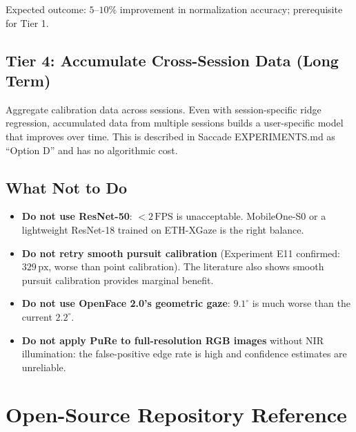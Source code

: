 \documentclass[11pt,a4paper]{article}
\begin{document}
Expected outcome: $5$--$10\%$ improvement in normalization accuracy; prerequisite for Tier 1.

\subsection{Tier 4: Accumulate Cross-Session Data (Long Term)}

Aggregate calibration data across sessions.
Even with session-specific ridge regression, accumulated data from multiple sessions builds a user-specific model that improves over time.
This is described in Saccade EXPERIMENTS.md as ``Option D'' and has no algorithmic cost.

\subsection{What Not to Do}

\begin{itemize}
  \item \textbf{Do not use ResNet-50}: $<2\,\text{FPS}$ is unacceptable. MobileOne-S0 or a lightweight ResNet-18 trained on ETH-XGaze is the right balance.
  \item \textbf{Do not retry smooth pursuit calibration} (Experiment E11 confirmed: $329\,\text{px}$, worse than point calibration). The literature also shows smooth pursuit calibration provides marginal benefit.
  \item \textbf{Do not use OpenFace 2.0's geometric gaze}: $9.1^\circ$ is much worse than the current $2.2^\circ$.
  \item \textbf{Do not apply PuRe to full-resolution RGB images} without NIR illumination: the false-positive edge rate is high and confidence estimates are unreliable.
\end{itemize}

\section{Open-Source Repository Reference}
\label{sec:repos}
\end{document}
